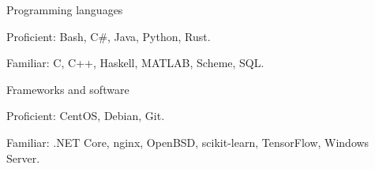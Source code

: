 
\begin{cventries}
  \cventry
    {}
    {Programming languages} %
    {}
    {}
    {
      \begin{cvitems} %
         \item {Proficient: Bash, C\#, Java, Python, Rust.}
         \vspace{0.5mm}
         \item {Familiar: C, C++, Haskell, MATLAB, Scheme, SQL.}
      \end{cvitems}
    }
    
  \cventry
    {}
    {Frameworks and software}
    {}
    {}
    {
      \begin{cvitems}
         \item {Proficient: CentOS, Debian, Git.}
         \vspace{0.5mm}
         \item {Familiar: .NET Core, nginx, OpenBSD, scikit-learn, TensorFlow, Windows Server.}
      \end{cvitems}
    }
\end{cventries}
